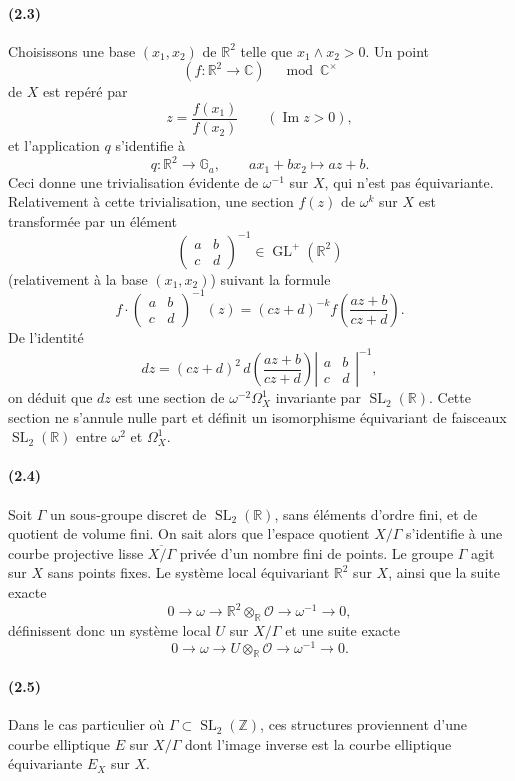 \documentclass[10pt]{article}
\newcommand{\C}{\mathbb C}
\newcommand{\R}{\mathbb R}
\newcommand{\Z}{\mathbb Z}
\newcommand{\Ga}{\mathbb G_a}
\newcommand{\GL}{\operatorname{GL}}
\newcommand{\SL}{\operatorname{SL}}
\newcommand{\cO}{\mathcal O}
\begin{document}
\paragraph{(2.3)}
Choisissons une base $(x_1,x_2)$ de $\R^2$ telle que $x_1\wedge x_2>0$. Un point
\[
(f:\R^2\to \C)\quad \bmod \C^\times
\]
de $X$ est repéré par
\[
z=\frac{f(x_1)}{f(x_2)}\qquad (\operatorname{Im}z>0),
\]
et l'application $q$ s'identifie à
\[
q:\R^2\to\Ga,\qquad ax_1+bx_2\longmapsto az+b.
\]
Ceci donne une trivialisation évidente de $\omega^{-1}$ sur $X$, qui n'est pas équivariante.
Relativement à cette trivialisation, une section $f(z)$ de $\omega^k$ sur $X$ est transformée
par un élément
\[
\begin{pmatrix}a&b\\ c&d\end{pmatrix}^{-1}\in \GL^+(\R^2)
\]
(relativement à la base $(x_1,x_2)$) suivant la formule
\[
f\cdot
\begin{pmatrix}a&b\\ c&d\end{pmatrix}^{-1}(z)
=(cz+d)^{-k}f\!\left(\frac{az+b}{cz+d}\right).
\]
De l'identité
\[
dz=(cz+d)^2\,d\!\left(\frac{az+b}{cz+d}\right)
\left|\begin{matrix}a&b\\ c&d\end{matrix}\right|^{-1},
\]
on déduit que $dz$ est une section de $\omega^{-2}\Omega^1_X$ invariante par
$\SL_2(\R)$. Cette section ne s'annule nulle part et définit un isomorphisme équivariant
de faisceaux $\SL_2(\R)$ entre $\omega^2$ et $\Omega^1_X$.

\paragraph{(2.4)}
Soit $\Gamma$ un sous-groupe discret de $\SL_2(\R)$, sans éléments d'ordre fini, et de
quotient de volume fini. On sait alors que l'espace quotient $X/\Gamma$ s'identifie à une
courbe projective lisse $\overline{X/\Gamma}$ privée d'un nombre fini de points. Le groupe
$\Gamma$ agit sur $X$ sans points fixes. Le système local équivariant $\R^2$ sur $X$,
ainsi que la suite exacte
\[
0\to \omega\to \R^2\otimes_\R\cO\to\omega^{-1}\to 0,
\]
définissent donc un système local $U$ sur $X/\Gamma$ et une suite exacte
\[
0\to \omega\to U\otimes_\R\cO\to\omega^{-1}\to 0.
\]

\paragraph{(2.5)}
Dans le cas particulier où $\Gamma\subset\SL_2(\Z)$, ces structures proviennent d'une
courbe elliptique $E$ sur $X/\Gamma$ dont l'image inverse est la courbe elliptique
équivariante $E_X$ sur $X$.
\end{document}
